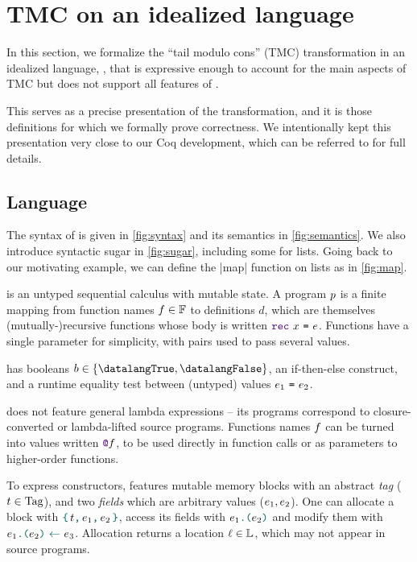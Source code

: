 \section{TMC on an idealized language}

In this section, we formalize the ``tail modulo cons'' (TMC) transformation in an idealized language, \DataLang, that is expressive enough to account for the main aspects of TMC but does not support all features of \OCaml.

This serves as a precise presentation of the transformation, and it is those definitions for which we formally prove correctness. We intentionally kept this presentation very close to our Coq development, which can be referred to for full details.






\subsection{Language}

The syntax of \DataLang is given in \cref{fig:syntax} and its semantics in \cref{fig:semantics}.
We also introduce syntactic sugar in \cref{fig:sugar}, including some for lists.
Going back to our motivating example, we can define the \datalang|map| function on lists as in \cref{fig:map}.

\DataLang is an untyped sequential calculus with mutable state. A \DataLang program $\datalangProg$ is a finite mapping from function names $\datalangFn \in \datalangFn[]$ to definitions $d$, which are themselves (mutually-)recursive functions whose body is written $\datalangRec \datalangVar \datalangExpr$. Functions have a single parameter for simplicity, with pairs used to pass several values.

\DataLang has booleans $b \in \{\datalangTrue, \datalangFalse\}$, an if-then-else construct, and a runtime equality test between (untyped) values $\datalangEq{\datalangExpr_1}{\datalangExpr_2}$.

\DataLang does not feature general lambda expressions -- its programs correspond to closure-converted or lambda-lifted source programs. Functions names $\datalangFn$ can be turned into values written $\datalangFnptr{\datalangFn}$, to be used directly in function calls or as parameters to higher-order functions.

To express constructors, \DataLang features mutable memory blocks with an abstract \emph{tag} ($\datalangTag \in \datalangTag[]$), and two \emph{fields} which are arbitrary values ($\datalangExpr_1, \datalangExpr_2$).
One can allocate a block with $\datalangBlock{\datalangTag}{\datalangExpr_1}{\datalangExpr_2}$, access its fields with $\datalangLoad{\datalangExpr_1}{\datalangExpr_2}$ and modify them with $\datalangStore{\datalangExpr_1}{\datalangExpr_2}{\datalangExpr_3}$.
Allocation returns a location $\datalangLoc \in \datalangLoc[]$, which may not appear in source programs.

